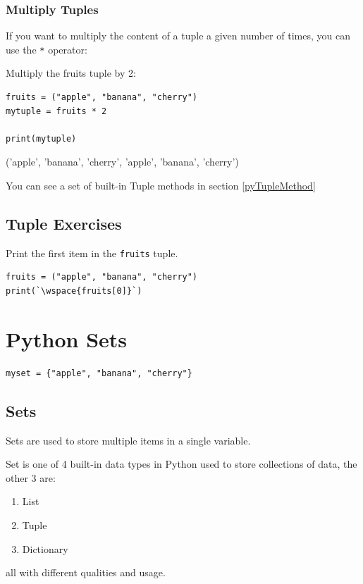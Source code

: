 \documentclass[12pt,a4paper]{article}
\newcommand{\wspace}[1]{%
	\color{white}\colorbox{white}{\texttt{#1}}%
}
\newcommand{\code}[1]{%
	\colorbox{backcolour}{\lstinline{#1}}%
}
\newcommand{\lcode}[1]{%
	\lstinline{#1}%
}
\begin{document}
\subsubsection{Multiply Tuples}

If you want to multiply the content of a tuple a given number of times, you can
use the \code{*} operator:

\begin{ebox}
Multiply the fruits tuple by 2:
	\begin{lstlisting}
fruits = ("apple", "banana", "cherry")
mytuple = fruits * 2

print(mytuple)
	\end{lstlisting}
\tcblower
	\begin{vercode}
('apple', 'banana', 'cherry', 'apple', 'banana', 'cherry')
	\end{vercode}
\end{ebox}
You can see a set of built-in Tuple methods in section \ref{pyTupleMethod}
\subsection{Tuple Exercises}

\begin{tbox}
Print the first item in the \lcode{fruits} tuple.

	\begin{lstlisting}[numbers=none]
fruits = ("apple", "banana", "cherry")
print(`\wspace{fruits[0]}`)
	\end{lstlisting}
\end{tbox}
\vfill\newpage
\section{Python Sets}\label{pySets}

\begin{lstlisting}
myset = {"apple", "banana", "cherry"} 
\end{lstlisting}

\subsection{Sets}

Sets are used to store multiple items in a single variable.

Set is one of 4 built-in data types in Python used to store collections of
data, the other 3 are:
\begin{multicols}{2}
\begin{enumerate}
	\item List
	\item Tuple
	\item Dictionary
\end{enumerate}
\end{multicols}
all with different qualities and usage.
\end{document}
